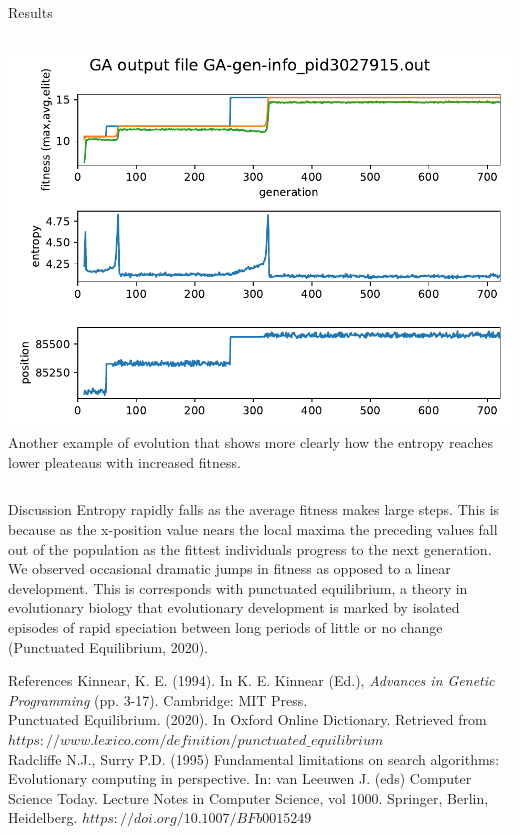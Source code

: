 \documentclass[10pt,aspectratio=169]{beamer}
\begin{document}
\begin{frame}{Results}
\begin{columns}
    \begin{column}{0.6\textwidth}
     \includegraphics[width=\textwidth]{GA-gen-info_pid3027915.out.pdf}\\
      				{\tiny Another example of evolution that shows more clearly how
      				the entropy reaches lower pleateaus with increased fitness.}
    \end{column}
  \end{columns}
\end{frame}

\begin{frame}{Discussion}
	Entropy rapidly falls as the average fitness makes large steps. This
	is because as the x-position value nears the local maxima the
	preceding values fall out of the population as the fittest individuals
	progress to the next generation. We observed occasional dramatic jumps
	in fitness as opposed to a linear development. This is corresponds
	with punctuated equilibrium, a theory in evolutionary biology that
	evolutionary development is marked by isolated episodes of rapid
	speciation between long periods of little or no change (Punctuated
	Equilibrium, 2020).
\end{frame}

\begin{frame}{References}
	Kinnear, K. E. (1994). In K. E. Kinnear (Ed.), \emph{Advances in
	Genetic Programming} (pp. 3-17). Cambridge: MIT Press.\\
	\medskip
	Punctuated Equilibrium. (2020). In Oxford Online Dictionary. Retrieved
	from $https://www.lexico.com/definition/punctuated\_equilibrium$\\
	\medskip
	Radcliffe N.J., Surry P.D. (1995) Fundamental limitations on search
	algorithms: Evolutionary computing in perspective.  In: van Leeuwen
	J. (eds) Computer Science Today. Lecture Notes in Computer Science,
	vol 1000. Springer, Berlin, Heidelberg.
	$https://doi.org/10.1007/BFb0015249$\\
	
\end{frame}
\end{document}
